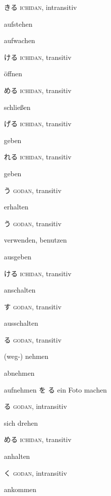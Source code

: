 \vocab
    {きる}
    {\textsc{ichidan}, intransitiv}
    {\item aufstehen
     \item aufwachen}

\vocab
  {ける}
  {\textsc{ichidan}, transitiv}
  {\item öffnen}

\vocab
  {める}
  {\textsc{ichidan}, transitiv}
  {\item schließen}

\vocab
  {げる}
  {\textsc{ichidan}, transitiv}
  {\item geben }

\vocab
  {れる}
  {\textsc{ichidan}, transitiv}
  {\item {} geben }

\vocab
  {う}
  {\textsc{godan}, transitiv}
  {\item {} erhalten}

\vocab
  {う}
  {\textsc{godan}, transitiv}
  {\item verwenden, benutzen
  \item ausgeben }

\vocab
    {ける}
    {\textsc{ichidan}, transitiv}
    {\item anschalten}

\vocab
    {す}
    {\textsc{godan}, transitiv}
    {\item ausschalten}

\vocab
  {る}
  {\textsc{godan}, transitiv}
  {\item (weg-) nehmen
   \item {} abnehmen 
   \item {} aufnehmen
   \example
     { を る}
     {ein Foto machen}
  }


\vocab
  {る}
  {\textsc{godan}, intransitiv}
  {\item sich drehen}

\vocab
  {める}
  {\textsc{ichidan}, transitiv}
  {\item anhalten}

\vocab
  {く}
  {\textsc{godan}, intransitiv}
  {\item ankommen}

